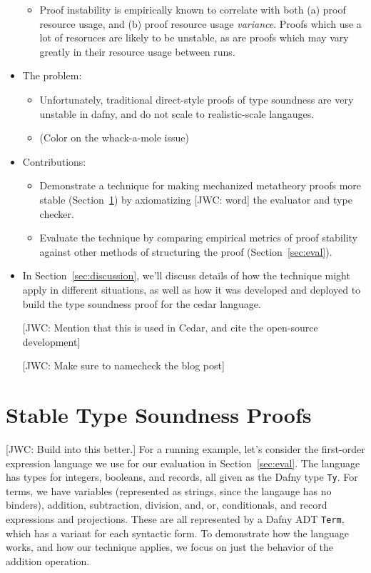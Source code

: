 \documentclass[sigplan,review,screen,anonymous]{acmart}
\newcommand{\comm}[3]{\textcolor{#1}{[#2: #3]}}
\newcommand{\jwc}[1]{\comm{dkgreen}{JWC}{#1}}
\begin{document}
\begin{itemize}
\begin{itemize}
      \item Proof instability is empirically known to correlate with both (a) proof resource usage, and (b) proof resource usage \emph{variance}.
      Proofs which use a lot of resoruces are likely to be unstable, as are proofs which may vary greatly in their resource usage between runs.
    \end{itemize}

    \item The problem:
    \begin{itemize}
      \item Unfortunately, traditional direct-style proofs of type soundness are very unstable in dafny, and do not scale to realistic-scale langauges.
      \item (Color on the whack-a-mole issue) 
    \end{itemize}

    \item Contributions: 
    \begin{itemize}
      \item Demonstrate a technique for making mechanized metatheory proofs more stable (Section~\ref{sec:sts}) by axiomatizing \jwc{word} the evaluator and type checker.
      \item Evaluate the technique by comparing empirical metrics of proof stability against other methods of structuring the proof (Section~\ref{sec:eval}).
    \end{itemize}

    \item In Section~\ref{sec:discussion}, we'll discuss details of how the technique might apply in different situations, as well as how it was developed and deployed to build the type soundness proof for the cedar language.

    \jwc{Mention that this is used in Cedar, and cite the open-source development}

    \jwc{Make sure to namecheck the blog post}
    
\end{itemize}

\section{Stable Type Soundness Proofs}
\label{sec:sts}

\jwc{Build into this better.}
For a running example, let's consider the first-order expression language we
use for our evaluation in Section~\ref{sec:eval}.  The language has
types for integers, booleans, and records, all given as the Dafny type
\texttt{Ty}.  For terms, we have variables (represented as strings, since the
langauge has no binders), addition, subtraction, division, and, or,
conditionals, and record expressions and projections. These are all represented
by a Dafny ADT \texttt{Term}, which has a variant for each syntactic form.
To demonstrate how the language works, and how our technique applies, we focus
on just the behavior of the addition operation.
\end{document}
